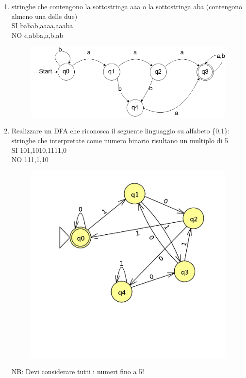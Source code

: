 \begin{enumerate}
\newpage
\item stringhe che contengono la sottostringa aaa o la sottostringa aba (contengono almeno una delle due)
\\ SI babab,aaaa,aaaba
\\ NO $\epsilon$,abba,a,b,ab

\begin{figure}[h]
  \includegraphics[scale = 0.5]{media/09_21_es5.png}
  \centering
\end{figure}

\item Realizzare un DFA che riconosca il seguente linguaggio su alfabeto \{0,1\}: stringhe che interpretate come numero binario risultano un multiplo di 5 
\\
SI 101,1010,1111,0
\\
NO 111,1,10

\begin{figure}[h]
  \includegraphics[scale = 0.25]{media/09_21_es6.jpg}
  \centering
\end{figure}
NB: Devi considerare tutti i numeri fino a 5!


\end{enumerate}
